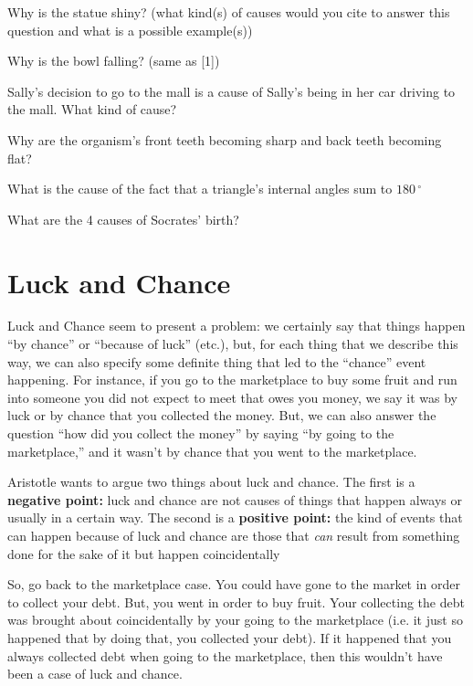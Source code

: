\documentclass[oneside]{article}
\begin{document}
\noindent [1] Why is the statue shiny? (what kind(s) of causes would you cite to answer this question and what is a possible example(s))
\vspace*{3mm}

\noindent [2] Why is the bowl falling? (same as [1])
\vspace*{3mm}

\noindent [3] Sally's decision to go to the mall is a cause of Sally's being in her car driving to the mall. What kind of cause? 
\vspace*{3mm}

\noindent [4] Why are the organism's front teeth becoming sharp and back teeth becoming flat? 
\vspace*{3mm}

\noindent [5] What is the  cause of the fact that a triangle's internal angles sum to $180\,^{\circ}$
\vspace*{3mm}

\noindent [6] What are the 4 causes of Socrates' birth?

\section*{Luck and Chance}

Luck and Chance seem to present a problem: we certainly say that things happen ``by chance'' or ``because of luck'' (etc.), but, for each thing that we describe this way, we can also specify some definite thing that led to the ``chance'' event happening. For instance, if you go to the marketplace to buy some fruit and run into someone you did not expect to meet that owes you money, we say it was by luck or by chance that you collected the money. But, we can also answer the question ``how did you collect the money'' by saying ``by going to the marketplace,'' and it wasn't by chance that you went to the marketplace.

Aristotle wants to argue two things about luck and chance. The first is a \textbf{negative point:} luck and chance are not causes of things that happen always or usually in a certain way. The second is a \textbf{positive point:} the kind of events that can happen because of luck and chance are those that \emph{can}  result from something done for the sake of it but happen coincidentally

So, go back to the marketplace case. You could have gone to the market in order to collect your debt. But,  you went in order to buy fruit. Your collecting the debt was brought about coincidentally by your going to the marketplace (i.e. it just so happened that by doing that, you collected your debt). If it happened that you always collected debt when going to the marketplace, then this wouldn't have been a case of luck and chance. 

\end{document}
